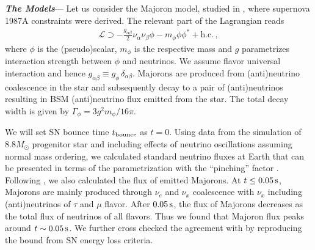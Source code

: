 
\textbf{\textit{The Models}}---
Let us consider the Majoron model, studied in \cite{Fiorillo:2022cdq}, where supernova 1987A constraints were derived. The relevant part of the Lagrangian reads
\begin{align}
\mathcal{L} \supset -\frac{g_{\alpha\beta}}{2} \nu_\alpha \nu_\beta \phi - m_\phi \phi\phi^* + \text{h.c.}\,,
\end{align}
where $\phi$ is the (pseudo)scalar, $m_\phi$ is the respective mass and $g$ parametrizes interaction strength between $\phi$ and neutrinos. We assume flavor universal interaction and hence $g_{\alpha\beta}\equiv g_\phi \, \delta_{\alpha\beta}$. Majorons are produced from (anti)neutrino coalescence in the star and subsequently decay to a pair of (anti)neutrinos resulting in BSM (anti)neutrino flux emitted from the star. The total decay width is given by $\Gamma_\phi = 3g^2 m_\phi/16 \pi$.

We will set SN bounce time $t_{\rm bounce}$ as $t = 0$. Using data from the simulation of $8.8 M_\odot$ progenitor star \cite{Huedepohl2010, Garching} and including effects of neutrino oscillations assuming normal mass ordering, we calculated standard neutrino fluxes at Earth that can be presented in terms of the parametrization with the ``pinching'' factor \cite{Keil:2002in,baxter2021snewpy}. Following \cite{Fiorillo:2022cdq}, we also calculated the flux of emitted Majorons. At $t \leq \unit[0.05]{s}$, Majorons are mainly produced through 
$\nu_e$ and $\nu_x$ coalescence with $\nu_x$ including (anti)neutrinos of $\tau$ and $\mu$ flavor. 
After $\unit[0.05]{s}$, the flux of Majorons decreases as the total flux of neutrinos of all flavors. Thus we found that Majoron flux peaks around $t \sim \unit[0.05]{s}$.
We further cross checked the agreement with \cite{Fiorillo:2022cdq} by reproducing the bound from SN energy loss criteria. 

